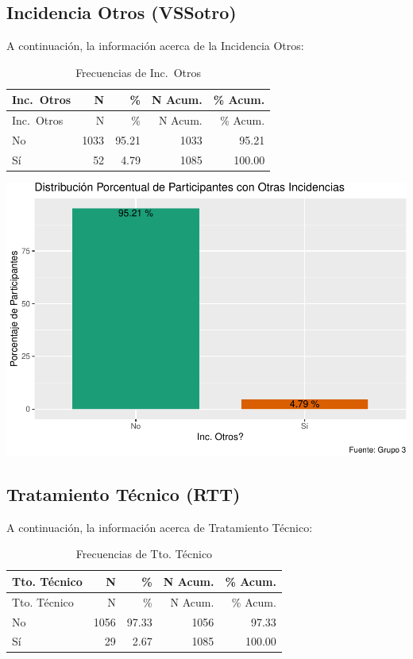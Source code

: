\documentclass[
]{article}
\begin{document}
\subsection{Incidencia Otros (VSSotro)}\label{incidencia-otros-vssotro}

A continuación, la información acerca de la Incidencia Otros:

\begin{longtable}[]{@{}lrrrr@{}}
\caption{Frecuencias de Inc.~Otros}\tabularnewline
\toprule\noalign{}
Inc.~Otros & N & \% & N Acum. & \% Acum. \\
\midrule\noalign{}
\endfirsthead
\toprule\noalign{}
Inc.~Otros & N & \% & N Acum. & \% Acum. \\
\midrule\noalign{}
\endhead
\bottomrule\noalign{}
\endlastfoot
No & 1033 & 95.21 & 1033 & 95.21 \\
Sí & 52 & 4.79 & 1085 & 100.00 \\
\end{longtable}

\includegraphics{Info_Dinix_02_files/figure-latex/30_VSSotro-1.pdf}

\subsection{Tratamiento Técnico (RTT)}\label{tratamiento-tuxe9cnico-rtt}

A continuación, la información acerca de Tratamiento Técnico:

\begin{longtable}[]{@{}lrrrr@{}}
\caption{Frecuencias de Tto. Técnico}\tabularnewline
\toprule\noalign{}
Tto. Técnico & N & \% & N Acum. & \% Acum. \\
\midrule\noalign{}
\endfirsthead
\toprule\noalign{}
Tto. Técnico & N & \% & N Acum. & \% Acum. \\
\midrule\noalign{}
\endhead
\bottomrule\noalign{}
\endlastfoot
No & 1056 & 97.33 & 1056 & 97.33 \\
Sí & 29 & 2.67 & 1085 & 100.00 \\
\end{longtable}
\end{document}
